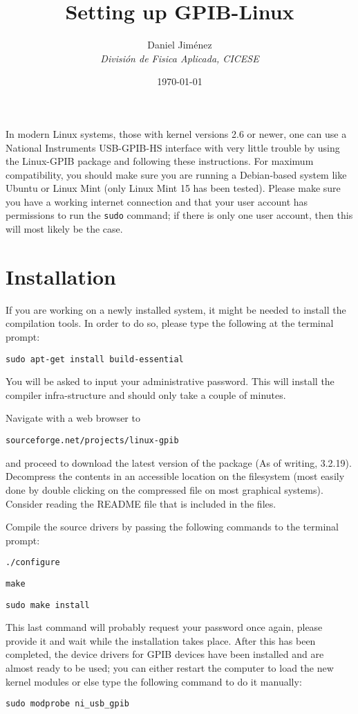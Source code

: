 \documentclass[letterpaper,11pt]{article}
\begin{document}
\date{\today}

\title{Setting up GPIB-Linux}
\author{Daniel Jim\'enez\\\emph{Divisi\'on de Fisica Aplicada, CICESE}}
\maketitle


In modern Linux systems, those with kernel versions 2.6 or newer, one can use a National Instruments USB-GPIB-HS interface with very little trouble by using the Linux-GPIB package and following these instructions. For maximum compatibility, you should make sure you are running a Debian-based system like Ubuntu or Linux Mint (only Linux Mint 15 has been tested). Please make sure you have a working internet connection and that your user account has permissions to run the \texttt{sudo} command; if there is only one user account, then this will most likely be the case.

\section{Installation}
If you are working on a newly installed system, it might be needed to install the compilation tools. In order to do so, please type the following at the terminal prompt:
 \begin{verbatim}
sudo apt-get install build-essential
 \end{verbatim}
You will be asked to input your administrative password. This will install the compiler infra-structure and should only take a couple of minutes.

Navigate with a web browser to 
 \begin{verbatim}
sourceforge.net/projects/linux-gpib
 \end{verbatim}
and proceed to download the latest version of the package (As of writing, 3.2.19). Decompress the contents in an accessible location on the filesystem (most easily done by double clicking on the compressed file on most graphical systems). Consider reading the README file that is included in the files.

Compile the source drivers by passing the following commands to the terminal prompt:
 \begin{verbatim}
./configure
 \end{verbatim}
 \begin{verbatim}
make
 \end{verbatim}
 \begin{verbatim}
sudo make install
 \end{verbatim}
This last command will probably request your password once again, please provide it and wait while the installation takes place. After this has been completed, the device drivers for GPIB devices have been installed and are almost ready to be used; you can either restart the computer to load the new kernel modules or else type the following command to do it manually:
 \begin{verbatim}
sudo modprobe ni_usb_gpib
 \end{verbatim}
\end{document}
